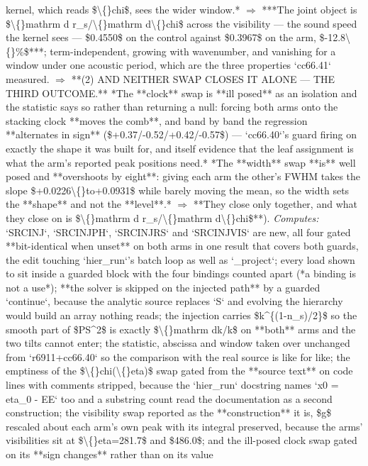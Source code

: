 \begin{description}
kernel, which reads \$\textbackslash\{\}chi\$, sees the wider window.* \ensuremath{\Rightarrow} ***The joint object is \$\textbackslash\{\}mathrm d r\_s/\textbackslash\{\}mathrm d\textbackslash\{\}chi\$ across the visibility --- the sound speed the kernel sees --- \$0.4550\$ on the control against \$0.3967\$ on the arm, \$-12.8\textbackslash\{\}\%\$***; term-independent, growing with wavenumber, and vanishing for a window under one acoustic period, which are the three properties `cc66.41` measured. \ensuremath{\Rightarrow}  **(2) AND NEITHER SWAP CLOSES IT ALONE --- THE THIRD OUTCOME.** *The **clock** swap is **ill posed** as an isolation and the statistic says so rather than returning a null: forcing both arms onto the stacking clock **moves the comb**, and band by band the regression **alternates in sign** (\$+0.37/-0.52/+0.42/-0.57\$) --- `cc66.40`'s guard firing on exactly the shape it was built for, and itself evidence that the leaf assignment is what the arm's reported peak positions need.*  *The **width** swap **is** well posed and **overshoots by eight**: giving each arm the other's FWHM takes the slope \$+0.0226\textbackslash\{\}to+0.0931\$ while barely moving the mean, so the width sets the **shape** and not the **level**.* \ensuremath{\Rightarrow} **They close only together, and what they close on is \$\textbackslash\{\}mathrm d r\_s/\textbackslash\{\}mathrm d\textbackslash\{\}chi\$**). 
\emph{Computes:} `SRCINJ`, `SRCINJPH`, `SRCINJRS` and `SRCINJVIS` are new, all four gated **bit-identical when unset** on both arms in one result that covers both guards, the edit touching `hier\_run`'s batch loop as well as `\_project`; every load shown to sit inside a guarded block with the four bindings counted apart (*a binding is not a use*); **the solver is skipped on the injected path** by a guarded `continue`, because the analytic source replaces `S` and evolving the hierarchy would build an array nothing reads; the injection carries \$k\textasciicircum{}\{(1-n\_s)/2\}\$ so the smooth part of \$PS\textasciicircum{}2\$ is exactly \$\textbackslash\{\}mathrm dk/k\$ on **both** arms and the two tilts cannot enter; the statistic, abscissa and window taken over unchanged from `r6911+cc66.40` so the comparison with the real source is like for like; the emptiness of the \$\textbackslash\{\}chi(\textbackslash\{\}eta)\$ swap gated from the **source text** on code lines with comments stripped, because the `hier\_run` docstring names `x0 = eta\_0 - EE` too and a substring count read the documentation as a second construction; the visibility swap reported as the **construction** it is, \$g\$ rescaled about each arm's own peak with its integral preserved, because the arms' visibilities sit at \$\textbackslash\{\}eta=281.7\$ and \$486.0\$; and the ill-posed clock swap gated on its **sign changes** rather than on its value

\end{description}
